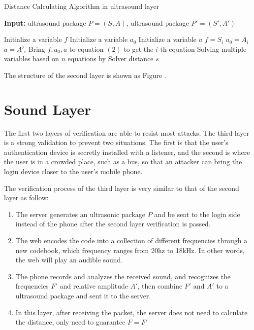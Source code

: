 \begin{algorithm}
\label{alg:distance}
\caption{Distance Calculating Algorithm in ultrasound layer}
\hspace*{\algorithmicindent} \textbf{Input:} ultrasound package $P=(S, A)$, ultrasound package $P'=(S', A')$
\begin{algorithmic}[1]
\State Initialize a variable $f$ 
\State Initialize a variable $a_0$
\State Initialize a variable $a$
\State $f=S_i$
\State $a_0=A_i$
\State $a=A'_i$
\State Bring $f, a_0, a$ to equation $(2)$ to get the $i$-th equation
\EndFor
\State Solving multiple variables based on $n$ equations by Solver
\Return distance $s$
\end{algorithmic}
\end{algorithm}

The structure of the second layer is shown as Figure \uppercase\expandafter{}.

\section{Sound Layer}
The first two layers of verification are able to resist most attacks. The third layer is a strong validation to prevent two situations. The first is that the user's authentication device is secretly installed with a listener, and the second is where the user is in a crowded place, such as a bus, so that an attacker can bring the login device closer to the user's mobile phone.




The verification process of the third layer is very similar to that of the second layer as follow:

\begin{enumerate}

\item The server generates an ultrasonic package $P$ and be sent to the login side instead of the phone after the second layer verification is passed.

\item The web encodes the code into a collection of different frequencies through a new codebook, which frequency ranges from 20hz to 18kHz. In other words, the web will play an audible sound.

\item The phone records and analyzes the received sound, and recognizes the frequencies $F'$ and relative amplitude $A'$, then combine $F'$ and $A'$ to a ultrasound package and sent it to the server.

\item In this layer, after receiving the packet, the server does not need to calculate the distance, only need to guarantee $F=F'$

\end{enumerate}

